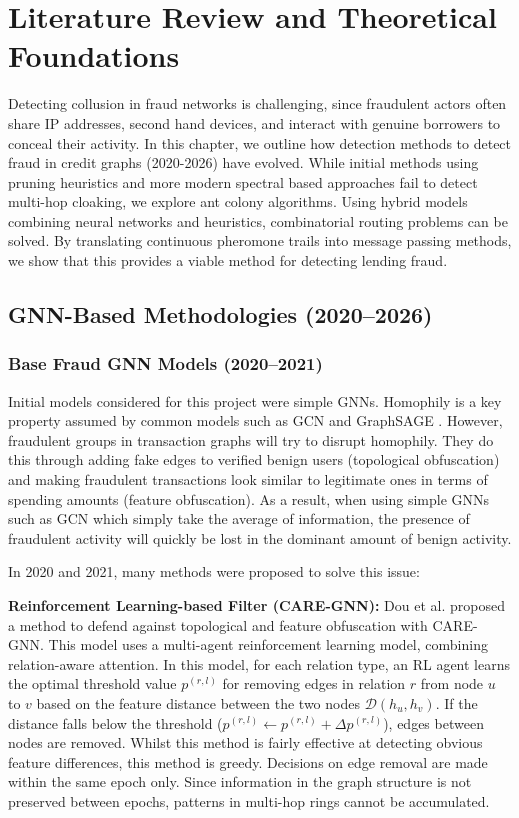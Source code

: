 \chapter{Literature Review and Theoretical Foundations}
\label{ch:funda}

Detecting collusion in fraud networks is challenging, since fraudulent actors often share IP addresses, second hand devices, and interact with genuine borrowers to conceal their activity. In this chapter, we outline how detection methods to detect fraud in credit graphs (2020-2026) have evolved. While initial methods using pruning heuristics and more modern spectral based approaches fail to detect multi-hop cloaking, we explore ant colony algorithms. Using hybrid models combining neural networks and heuristics, combinatorial routing problems can be solved. By translating continuous pheromone trails into message passing methods, we show that this provides a viable method for detecting lending fraud.

\section[GNN-Based Methodologies]{\textbf{GNN-Based Methodologies (2020--2026)}}
\label{sec:gnn_fraud_survey}

\subsection{Base Fraud GNN Models (2020--2021)}
Initial models considered for this project were simple GNNs. Homophily is a key property assumed by common models such as GCN \cite{kipf2017semi} and GraphSAGE \cite{hamilton2017inductive}. However, fraudulent groups in transaction graphs will try to disrupt homophily. They do this through adding fake edges to verified benign users (topological obfuscation) and making fraudulent transactions look similar to legitimate ones in terms of spending amounts (feature obfuscation). As a result, when using simple GNNs such as GCN which simply take the average of information, the presence of fraudulent activity will quickly be lost in the dominant amount of benign activity.

In 2020 and 2021, many methods were proposed to solve this issue:

\textbf{Reinforcement Learning-based Filter (CARE-GNN):} Dou et al. \cite{dou2020enhancing} proposed a method to defend against topological and feature obfuscation with CARE-GNN. This model uses a multi-agent reinforcement learning model, combining relation-aware attention. In this model, for each relation type, an RL agent learns the optimal threshold value $p^{(r,l)}$ for removing edges in relation $r$ from node $u$ to $v$ based on the feature distance between the two nodes $\mathcal{D}(h_u, h_v)$. If the distance falls below the threshold ($p^{(r,l)} \leftarrow p^{(r,l)} + \Delta p^{(r,l)}$), edges between nodes are removed. Whilst this method is fairly effective at detecting obvious feature differences, this method is greedy. Decisions on edge removal are made within the same epoch only. Since information in the graph structure is not preserved between epochs, patterns in multi-hop rings cannot be accumulated.


